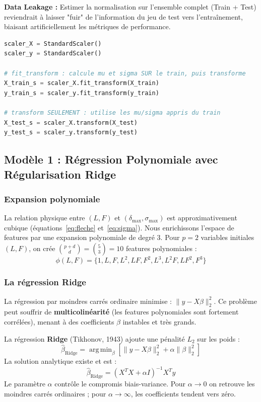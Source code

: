 \documentclass[journal, a4paper, twocolumn]{IEEEtran}
\DeclareMathOperator*{\argmin}{arg\,min}  %
\begin{document}
\textbf{Data Leakage :} Estimer la normalisation sur l'ensemble complet (Train + Test) reviendrait à laisser "fuir" de l'information du jeu de test vers l'entraînement, biaisant artificiellement les métriques de performance.

\begin{lstlisting}[language=Python, caption=Standardisation sans Data Leakage]
scaler_X = StandardScaler()
scaler_y = StandardScaler()

# fit_transform : calcule mu et sigma SUR le train, puis transforme
X_train_s = scaler_X.fit_transform(X_train)
y_train_s = scaler_y.fit_transform(y_train)

# transform SEULEMENT : utilise les mu/sigma appris du train
X_test_s = scaler_X.transform(X_test)
y_test_s = scaler_y.transform(y_test)
\end{lstlisting}

\subsection{Modèle 1 : Régression Polynomiale avec Régularisation Ridge}

\subsubsection{Expansion polynomiale}

La relation physique entre $(L, F)$ et $(\delta_{\max}, \sigma_{\max})$ est approximativement cubique (équations~\eqref{eq:fleche} et~\eqref{eq:sigma}). Nous enrichissons l'espace de features par une expansion polynomiale de degré 3. Pour $p=2$ variables initiales $(L, F)$, on crée $\binom{p+d}{d} = \binom{5}{3} = 10$ features polynomiales :
\begin{equation}
    \phi(L,F) = \{1, L, F, L^2, LF, F^2, L^3, L^2F, LF^2, F^3\}
\end{equation}

\subsubsection{La régression Ridge}

La régression par moindres carrés ordinaire minimise :
$\|y - X\beta\|_2^2$. Ce problème peut souffrir de \textbf{multicolinéarité} (les features polynomiales sont fortement corrélées), menant à des coefficients $\beta$ instables et très grands.

La régression \textbf{Ridge} (Tikhonov, 1943) ajoute une pénalité $L_2$ sur les poids :
\begin{equation}
    \hat{\beta}_{\text{Ridge}} = \argmin_\beta \left[ \|y - X\beta\|_2^2 + \alpha \|\beta\|_2^2 \right]
\end{equation}
La solution analytique existe et est :
\begin{equation}
    \hat{\beta}_{\text{Ridge}} = (X^TX + \alpha I)^{-1} X^T y
\end{equation}
Le paramètre $\alpha$ contrôle le compromis biais-variance. Pour $\alpha \to 0$ on retrouve les moindres carrés ordinaires ; pour $\alpha \to \infty$, les coefficients tendent vers zéro.
\end{document}
